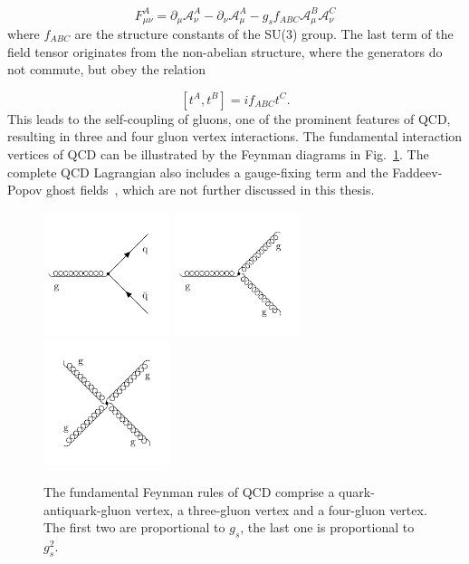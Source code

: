 \begin{equation*}
    F_{\mu\nu}^A = \partial_\mu \mathcal{A}_\nu^A - \partial_{\nu}
    \mathcal{A}_{\mu}^A - g_s f_{ABC} \mathcal{A}_{\mu}^B
    \mathcal{A}_{\nu}^C
\end{equation*}
%
where $f_{ABC}$ are the structure constants of the SU(3) group. The last term of
the field tensor originates from the non-abelian structure, where the generators
do not commute, but obey the relation

\begin{equation*}
    \left[t^A, t^B \right] = if_{ABC} t^{C}.
\end{equation*}
%
This leads to the self-coupling of gluons, one of the prominent features of QCD,
resulting in three and four gluon vertex interactions. The fundamental
interaction vertices of QCD can be illustrated by the Feynman diagrams in
Fig.~\ref{fig:fundamental_couplings}. The complete QCD Lagrangian also includes
a gauge-fixing term and the Faddeev-Popov ghost fields~\cite{Faddeev:1967fc},
which are not further discussed in this thesis.

\begin{figure}[htb] 
    \centering
    \includegraphics[width=0.33\textwidth]{figures/drawings/feynman/gqq.pdf}\hfill
    \includegraphics[width=0.33\textwidth]{figures/drawings/feynman/ggg.pdf}\hfill
    \includegraphics[width=0.33\textwidth]{figures/drawings/feynman/gggg.pdf}\hfill
    \caption[Fundamental vertices of QCD]{The fundamental Feynman rules of QCD
    comprise a quark-antiquark-gluon vertex, a three-gluon vertex and a four-gluon
    vertex. The first two are proportional to $g_{s}$, the last one is
    proportional to $g_{s}^2$.} 
    \label{fig:fundamental_couplings} 
\end{figure}

